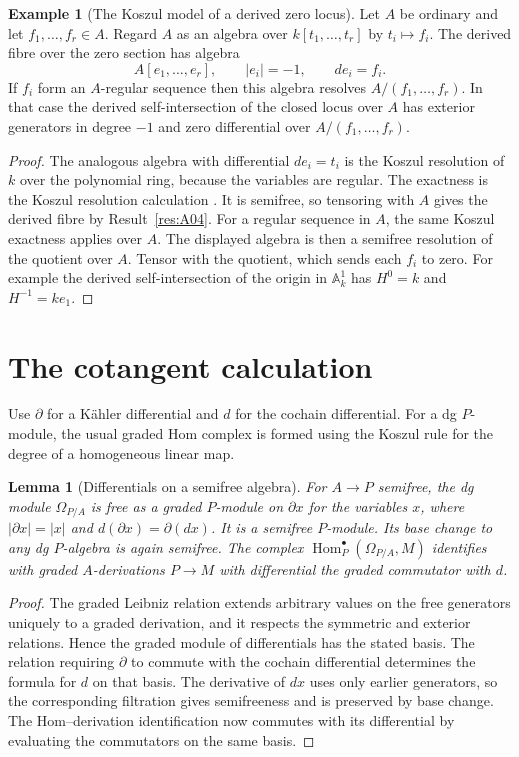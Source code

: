 \documentclass[11pt,oneside,openany]{book}
\newtheorem{lemma}[theorem]{Lemma}
\theoremstyle{definition}
\newtheorem{example}[theorem]{Example}
\theoremstyle{remark}
\begin{document}
\begin{example}[The Koszul model of a derived zero locus]\label{res:A05}
Let \(A\) be ordinary and let \(f_1,\ldots,f_r\in A\).
Regard \(A\) as an algebra over \(k[t_1,\ldots,t_r]\) by \(t_i\mapsto f_i\).
The derived fibre over the zero section has algebra
\[
     A[e_1,\ldots,e_r],\qquad |e_i|=-1,\qquad de_i=f_i .
\]
If \(f_i\) form an \(A\)-regular sequence then this algebra resolves
\(A/(f_1,\ldots,f_r)\). In that case the derived self-intersection
of the closed locus over \(A\) has exterior generators in degree
\(-1\) and zero differential over \(A/(f_1,\ldots,f_r)\).
\end{example}
\begin{proof}
The analogous algebra with differential \(de_i=t_i\) is the Koszul
resolution of \(k\) over the polynomial ring, because the variables
are regular. The exactness is the Koszul resolution calculation
\cite[RK-07]{ca-core}. It is semifree, so tensoring with \(A\)
gives the derived fibre by Result~\ref{res:A04}.
For a regular sequence in \(A\), the same Koszul exactness applies
over \(A\). The displayed algebra is then a semifree resolution of
the quotient over \(A\). Tensor with the quotient, which sends
each \(f_i\) to zero. For example the derived self-intersection of
the origin in \(\mathbb A^1_k\) has \(H^0=k\) and \(H^{-1}=k e_1\).
\end{proof}

\section{The cotangent calculation}

Use \(\partial\) for a K\"ahler differential and \(d\) for the
cochain differential. For a dg \(P\)-module, the usual graded Hom
complex is formed using the Koszul rule for the degree of a
homogeneous linear map.

\begin{lemma}[Differentials on a semifree algebra]\label{res:A06}
For \(A\to P\) semifree, the dg module \(\Omega_{P/A}\) is free
as a graded \(P\)-module on \(\partial x\) for the variables \(x\),
where \(|\partial x|=|x|\) and \(d(\partial x)=\partial(dx)\).
It is a semifree \(P\)-module. Its base change to any dg \(P\)-algebra
is again semifree. The complex
\(\operatorname{Hom}^{\bullet}_P(\Omega_{P/A},M)\) identifies with
graded \(A\)-derivations \(P\to M\) with differential the graded
commutator with \(d\).
\end{lemma}
\begin{proof}
The graded Leibniz relation extends arbitrary values on the free
generators uniquely to a graded derivation, and it respects
the symmetric and exterior relations. Hence the graded module of
differentials has the stated basis. The relation requiring
\(\partial\) to commute with the cochain differential determines
the formula for \(d\) on that basis. The derivative of \(dx\) uses
only earlier generators, so the corresponding filtration gives
semifreeness and is preserved by base change. The Hom--derivation
identification now commutes with its differential by evaluating
the commutators on the same basis.
\end{proof}
\end{document}
